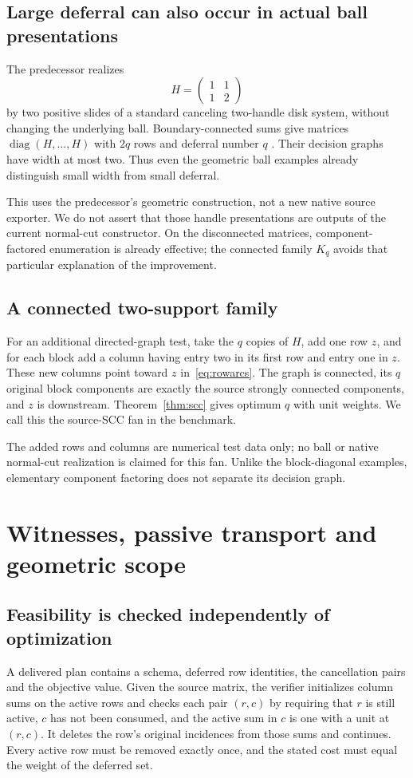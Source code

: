 \documentclass[11pt]{article}
\theoremstyle{definition}\newtheorem{definition}[theorem]{Definition}
\theoremstyle{remark}\newtheorem{remark}[theorem]{Remark}
\begin{document}
\subsection{Large deferral can also occur in actual ball presentations}
The predecessor realizes
\[
 H=\begin{pmatrix}1&1\\1&2\end{pmatrix}
\]
by two positive slides of a standard canceling two-handle disk system, without changing the underlying ball. Boundary-connected sums give matrices $\operatorname{diag}(H,\ldots,H)$ with $2q$ rows and deferral number $q$ \cite{positive}. Their decision graphs have width at most two. Thus even the geometric ball examples already distinguish small width from small deferral.

This uses the predecessor's geometric construction, not a new native source exporter. We do not assert that those handle presentations are outputs of the current normal-cut constructor. On the disconnected matrices, component-factored enumeration is already effective; the connected family $K_q$ avoids that particular explanation of the improvement.

\subsection{A connected two-support family}
For an additional directed-graph test, take the $q$ copies of $H$, add one row $z$, and for each block add a column having entry two in its first row and entry one in $z$. These new columns point toward $z$ in~\eqref{eq:rowarcs}. The graph is connected, its $q$ original block components are exactly the source strongly connected components, and $z$ is downstream. Theorem~\ref{thm:scc} gives optimum $q$ with unit weights. We call this the source-SCC fan in the benchmark.

The added rows and columns are numerical test data only; no ball or native normal-cut realization is claimed for this fan. Unlike the block-diagonal examples, elementary component factoring does not separate its decision graph.

\section{Witnesses, passive transport and geometric scope}
\label{sec:transport}

\subsection{Feasibility is checked independently of optimization}
A delivered plan contains a schema, deferred row identities, the cancellation pairs and the objective value. Given the source matrix, the verifier initializes column sums on the active rows and checks each pair $(r,c)$ by requiring that $r$ is still active, $c$ has not been consumed, and the active sum in $c$ is one with a unit at $(r,c)$. It deletes the row's original incidences from those sums and continues. Every active row must be removed exactly once, and the stated cost must equal the weight of the deferred set.
\end{document}
